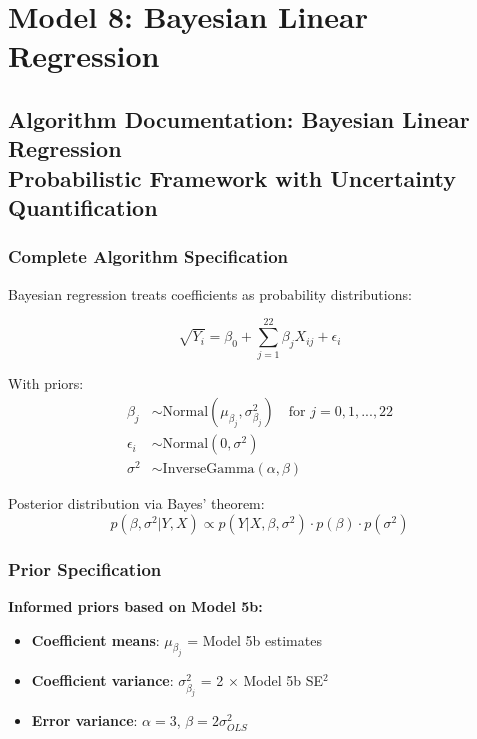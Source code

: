 \chapter{Model 8: Bayesian Linear Regression}\newpage

\section{Algorithm Documentation: Bayesian Linear Regression\\Probabilistic Framework with Uncertainty Quantification}

\subsection{Complete Algorithm Specification}

Bayesian regression treats coefficients as probability distributions:

\begin{equation}
\sqrt{Y_i} = \beta_0 + \sum_{j=1}^{22} \beta_j X_{ij} + \epsilon_i
\end{equation}

With priors:
\begin{align}
\beta_j &\sim \text{Normal}(\mu_{\beta_j}, \sigma^2_{\beta_j}) \quad \text{for } j = 0, 1, ..., 22 \\
\epsilon_i &\sim \text{Normal}(0, \sigma^2) \\
\sigma^2 &\sim \text{InverseGamma}(\alpha, \beta)
\end{align}

Posterior distribution via Bayes' theorem:
\begin{equation}
p(\beta, \sigma^2 | Y, X) \propto p(Y | X, \beta, \sigma^2) \cdot p(\beta) \cdot p(\sigma^2)
\end{equation}

\subsection{Prior Specification}

\textbf{Informed priors based on Model 5b:}
\begin{itemize}
    \item \textbf{Coefficient means}: $\mu_{\beta_j}$ = Model 5b estimates
    \item \textbf{Coefficient variance}: $\sigma^2_{\beta_j}$ = 2 $\times$ Model 5b SE$^2$
    \item \textbf{Error variance}: $\alpha = 3$, $\beta = 2\sigma^2_{OLS}$
\end{itemize}

